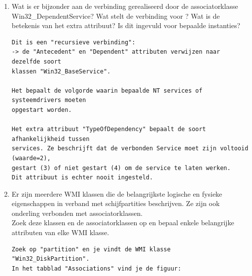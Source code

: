 \documentclass[11pt,a4paper]{report}
\begin{document}
\begin{enumerate}[resume]
	\item Wat is er bijzonder aan de verbinding gerealiseerd door de associatorklasse Win32\_DependentService? Wat stelt de verbinding voor ? Wat is de betekenis van het extra attribuut? Is dit ingevuld voor bepaalde instanties?
	\begin{lstlisting}
Dit is een "recursieve verbinding": 
-> de "Antecedent" en "Dependent" attributen verwijzen naar dezelfde soort 
klassen "Win32_BaseService".  

Het bepaalt de volgorde waarin bepaalde NT services of systeemdrivers moeten 
opgestart worden.

Het extra attribuut "TypeOfDependency" bepaalt de soort afhankelijkheid tussen 
services. Ze beschrijft dat de verbonden Service moet zijn voltooid (waarde=2), 
gestart (3) of niet gestart (4) om de service te laten werken.
Dit attribuut is echter nooit ingesteld.
	\end{lstlisting}
	\item Er zijn meerdere WMI klassen die de belangrijkste logische en fysieke eigenschappen in verband met schijfpartities  beschrijven. Ze zijn ook onderling verbonden met associatorklassen.\\
	Zoek deze klassen en de associatorklassen op en bepaal enkele belangrijke attributen van elke WMI klasse.
	\begin{lstlisting}
Zoek op "partition" en je vindt de WMI klasse "Win32_DiskPartition". 
In het tabblad "Associations" vind je de figuur:


\end{lstlisting}
\end{enumerate}
\end{document}

